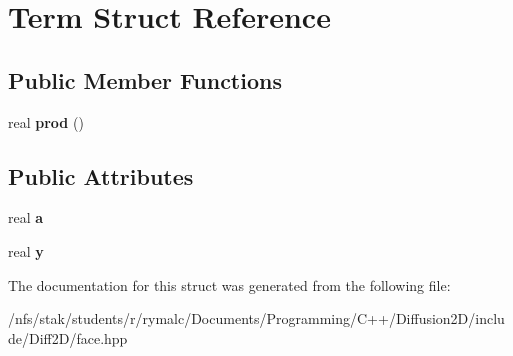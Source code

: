 \hypertarget{structTerm}{
\section{Term Struct Reference}
\label{structTerm}
}
\subsection*{Public Member Functions}
\begin{DoxyCompactItemize}
\item 
\hypertarget{structTerm_a90008c143070b0544ea0a5de0dd0d651}{
real {\bfseries prod} ()}
\label{structTerm_a90008c143070b0544ea0a5de0dd0d651}

\end{DoxyCompactItemize}
\subsection*{Public Attributes}
\begin{DoxyCompactItemize}
\item 
\hypertarget{structTerm_a5b8e26faad37a4317ce722efbb2fb345}{
real {\bfseries a}}
\label{structTerm_a5b8e26faad37a4317ce722efbb2fb345}

\item 
\hypertarget{structTerm_adc6281bf7884d8b213aa98a701b4e578}{
real {\bfseries y}}
\label{structTerm_adc6281bf7884d8b213aa98a701b4e578}

\end{DoxyCompactItemize}


The documentation for this struct was generated from the following file:\begin{DoxyCompactItemize}
\item 
/nfs/stak/students/r/rymalc/Documents/Programming/C++/Diffusion2D/include/Diff2D/face.hpp\end{DoxyCompactItemize}
